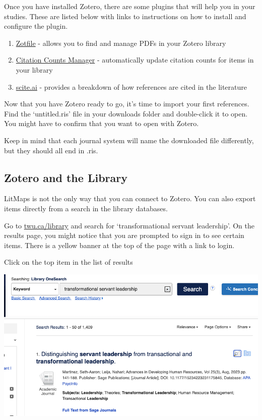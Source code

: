 \documentclass[
]{book}
\providecommand{\tightlist}{%
  \setlength{\itemsep}{0pt}\setlength{\parskip}{0pt}}
\theoremstyle{definition}
\theoremstyle{definition}
\theoremstyle{definition}
\theoremstyle{definition}
\theoremstyle{remark}
\begin{document}
Once you have installed Zotero, there are some plugins that will help you in your studies. These are listed below with links to instructions on how to install and configure the plugin.

\begin{enumerate}
\def\labelenumi{\arabic{enumi}.}
\tightlist
\item
  \href{http://zotfile.com/\#how-to-install--set-up-zotfile}{Zotfile} - allows you to find and manage PDFs in your Zotero library
\item
  \href{https://github.com/eschnett/zotero-citationcounts\#installing}{Citation Counts Manager} - automatically update citation counts for items in your library
\item
  \href{https://github.com/scitedotai/scite-zotero-plugin\#installation}{scite.ai} - provides a breakdown of how references are cited in the literature
\end{enumerate}

Now that you have Zotero ready to go, it's time to import your first references. Find the `untitled.ris' file in your downloads folder and double-click it to open. You might have to confirm that you want to open with Zotero.

Keep in mind that each journal system will name the downloaded file differently, but they should all end in .ris.

\hypertarget{zotero-and-the-library}{%
\subsection*{Zotero and the Library}\label{zotero-and-the-library}}

LitMaps is not the only way that you can connect to Zotero. You can also export items directly from a search in the library databases.

Go to \href{https://twu.ca/library}{twu.ca/library} and search for `transformational servant leadership'. On the results page, you might notice that you are prompted to sign in to see certain items. There is a yellow banner at the top of the page with a link to login.

Click on the top item in the list of results

\includegraphics{assets/u2/library1.png}
\end{document}
